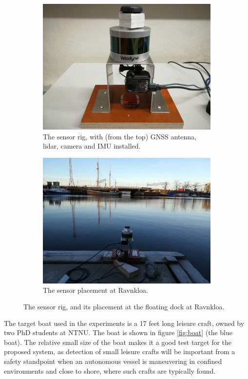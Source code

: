 \begin{figure}[H]
	\centering
	\begin{subfigure}{.5\textwidth}
		\centering
		\includegraphics[width=.8\linewidth]{fig/sensor_rig.jpg}
		\caption{The sensor rig, with (from the top) GNSS antenna, lidar, camera and IMU installed.}
		\label{fig:sub_sensorrig}
	\end{subfigure}%
	\begin{subfigure}{.5\textwidth}
		\centering
		\includegraphics[width=.8\linewidth]{fig/sensors_ravnkloa.jpg}
		\caption{The sensor placement at Ravnkloa.}
		\label{fig:sub_sensor_ravnkloa}
	\end{subfigure}
	\caption{The sensor rig, and its placement at the floating dock at Ravnkloa.}
	\label{fig:sensors_ravnkloa}
\end{figure}
The target boat used in the experiments is a 17 feet long leisure craft, owned by two PhD students at NTNU.
The boat is shown in figure \ref{fig:boat} (the blue boat). The relative small size of the boat makes it a good test target for the proposed system, as detection of small leisure crafts will be important from a safety standpoint when an autonomous vessel is maneuvering in confined environments and close to shore, where such crafts are typically found.
